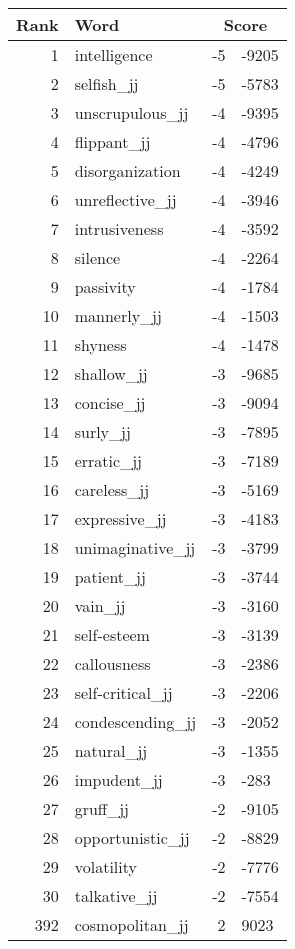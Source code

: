 \begin{longtable}[!htbp]{| rlr@{.}l |}
    \hline
    \textbf{Rank} & \textbf{Word} & \multicolumn{2}{c|}{\textbf{Score}} \\
    \hline
    \endhead
    1 & intelligence & -5 & -9205 \\
    2 & selfish\_jj & -5 & -5783 \\
    3 & unscrupulous\_jj & -4 & -9395 \\
    4 & flippant\_jj & -4 & -4796 \\
    5 & disorganization & -4 & -4249 \\
    6 & unreflective\_jj & -4 & -3946 \\
    7 & intrusiveness & -4 & -3592 \\
    8 & silence & -4 & -2264 \\
    9 & passivity & -4 & -1784 \\
    10 & mannerly\_jj & -4 & -1503 \\
    11 & shyness & -4 & -1478 \\
    12 & shallow\_jj & -3 & -9685 \\
    13 & concise\_jj & -3 & -9094 \\
    14 & surly\_jj & -3 & -7895 \\
    15 & erratic\_jj & -3 & -7189 \\
    16 & careless\_jj & -3 & -5169 \\
    17 & expressive\_jj & -3 & -4183 \\
    18 & unimaginative\_jj & -3 & -3799 \\
    19 & patient\_jj & -3 & -3744 \\
    20 & vain\_jj & -3 & -3160 \\
    21 & self-esteem & -3 & -3139 \\
    22 & callousness & -3 & -2386 \\
    23 & self-critical\_jj & -3 & -2206 \\
    24 & condescending\_jj & -3 & -2052 \\
    25 & natural\_jj & -3 & -1355 \\
    26 & impudent\_jj & -3 & -283 \\
    27 & gruff\_jj & -2 & -9105 \\
    28 & opportunistic\_jj & -2 & -8829 \\
    29 & volatility & -2 & -7776 \\
    30 & talkative\_jj & -2 & -7554 \\
    392 & cosmopolitan\_jj & 2 & 9023 \\

\end{longtable}
